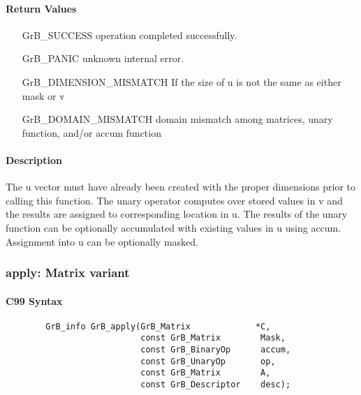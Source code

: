 \paragraph{Return Values}

\begin{itemize}[leftmargin=2.1in]
\item[{\sf GrB\_SUCCESS}]     operation completed successfully.
\item[{\sf GrB\_PANIC}]        unknown internal error.
\item[{\sf GrB\_DIMENSION\_MISMATCH}]            
        If the size of {\sf u} is not the same as either {\sf mask} or {\sf v}
\item[{\sf GrB\_DOMAIN\_MISMATCH}]  
        domain mismatch among matrices, unary function, and/or
        accum function 
\end{itemize}

\paragraph{Description}

The {\sf u} vector must have already been created with the proper dimensions
prior to calling this function.  The unary operator computes over stored values in {\sf v} and the results are assigned to corresponding location in {\sf u}.
The results of the unary function can be optionally accumulated with existing values in {\sf u} using {\sf accum}.  Assignment into {\sf u} can be optionally masked.


\subsubsection{{\sf apply}: Matrix variant}

\paragraph{C99 Syntax}

\begin{verbatim}
        GrB_info GrB_apply(GrB_Matrix             *C,
                           const GrB_Matrix        Mask,
                           const GrB_BinaryOp      accum,
                           const GrB_UnaryOp       op,
                           const GrB_Matrix        A,
                           const GrB_Descriptor    desc);
\end{verbatim}

